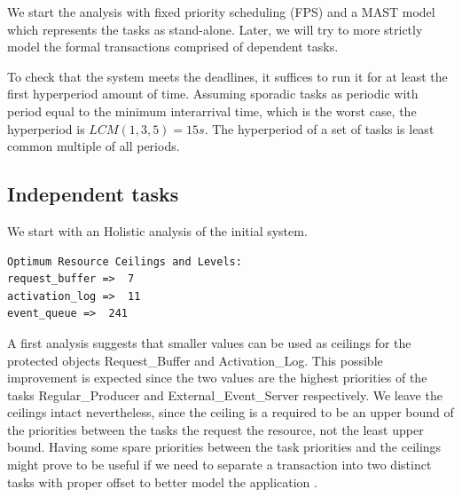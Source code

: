 \documentclass{article}
\begin{document}
We start the analysis with fixed priority scheduling (FPS) and a MAST model which represents the tasks as stand-alone. Later, we will try to more strictly model the formal transactions comprised of dependent tasks.

To check that the system meets the deadlines, it suffices to run it for at least the first hyperperiod amount of time. Assuming sporadic tasks as periodic with period equal to the minimum interarrival time, which is the worst case, the hyperperiod is $LCM(1, 3, 5) = 15s$. The hyperperiod of a set of tasks is least common multiple of all periods.

\subsection{Independent tasks}

We start with an Holistic analysis of the initial system.

\begin{lstlisting}
Optimum Resource Ceilings and Levels:
request_buffer =>  7
activation_log =>  11
event_queue =>  241
\end{lstlisting}

A first analysis suggests that smaller values can be used as ceilings for the protected objects Request\_Buffer and Activation\_Log. This possible improvement is expected since the two values are the highest priorities of the tasks Regular\_Producer and External\_Event\_Server respectively. We leave the ceilings intact nevertheless, since the ceiling is a required to be an upper bound of the priorities between the tasks the request the resource, not the least upper bound. Having some spare priorities between the task priorities and the ceilings might prove to be useful if we need to separate a transaction into two distinct tasks with proper offset to better model the application \cite{tindell-offsets}.
\end{document}
